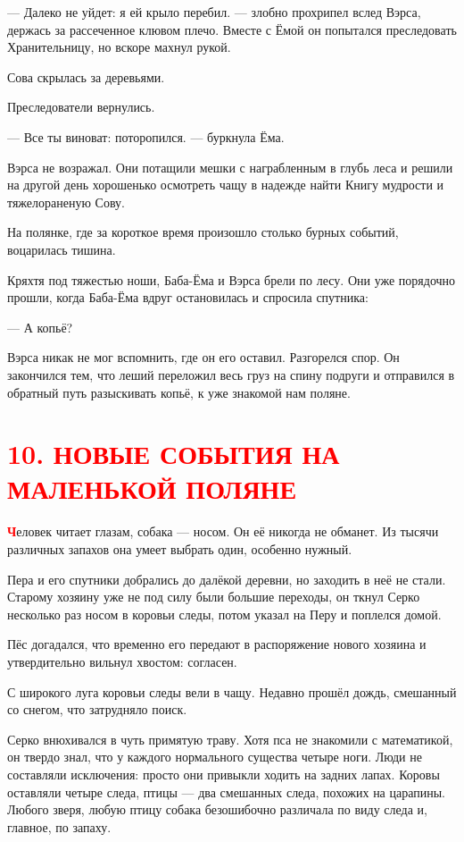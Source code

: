 \documentclass[oneside,final,14pt]{extreport}
\begin{document}
	— Далеко не уйдет: я ей крыло перебил. — злобно прохрипел вслед Вэрса, держась за рассеченное клювом плечо. Вместе с Ёмой он попытался преследовать Хранительницу, но вскоре махнул рукой.
	
	Сова скрылась за деревьями.
	
	Преследователи вернулись.
	
	— Все ты виноват: поторопился. — буркнула Ёма.
	
	Вэрса не возражал. Они потащили мешки с награбленным в глубь леса и решили на другой день хорошенько осмотреть чащу в надежде найти Книгу мудрости и тяжелораненую Сову.
	
	На полянке, где за короткое время произошло столько бурных событий, воцарилась тишина.
	
	Кряхтя под тяжестью ноши, Баба-Ёма и Вэрса брели по лесу. Они уже порядочно прошли, когда Баба-Ёма вдруг остановилась и спросила спутника:
	
	— А копьё?
	
	Вэрса никак не мог вспомнить, где он его оставил. Разгорелся спор. Он закончился тем, что леший переложил весь груз на спину подруги и отправился в обратный путь разыскивать копьё, к уже знакомой нам поляне.
	
\section[10. Новые события на маленькой поляне]{\center \textcolor{red}{10. НОВЫЕ СОБЫТИЯ НА МАЛЕНЬКОЙ ПОЛЯНЕ}}
	
	\lettrine[findent=0pt]{\textbf{\textcolor{red}{Ч}}}{}еловек читает глазам, собака — носом. Он её никогда не обманет. Из тысячи различных запахов она умеет выбрать один, особенно нужный.
	
	Пера и его спутники добрались до далёкой деревни, но заходить в неё не стали. Старому хозяину уже не под силу были большие переходы, он ткнул Серко несколько раз носом в коровьи следы, потом указал на Перу и поплелся домой.
	
	Пёс догадался, что временно его передают в распоряжение нового хозяина и утвердительно вильнул хвостом: согласен.
	
	С широкого луга коровьи следы вели в чащу. Недавно прошёл дождь, смешанный со снегом, что затрудняло поиск.
	
	Серко внюхивался в чуть примятую траву. Хотя пса не знакомили с математикой, он твердо знал, что у каждого нормального существа четыре ноги. Люди не составляли исключения: просто они привыкли ходить на задних лапах. Коровы оставляли четыре следа, птицы — два смешанных следа, похожих на царапины. Любого зверя, любую птицу собака безошибочно различала по виду следа и, главное, по запаху.
	
\end{document}
